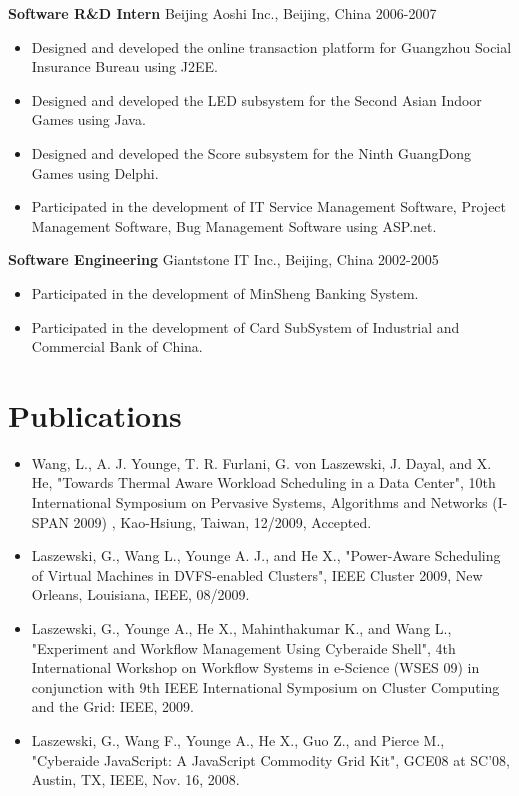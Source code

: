 \documentclass[margin]{res}
\begin{document}
\begin{resume}
{\bf Software R\&D Intern }  Beijing Aoshi Inc., Beijing, China 2006-2007
\begin{itemize}
\item Designed and developed the online transaction platform for Guangzhou Social Insurance Bureau using J2EE.
\item Designed and developed the LED subsystem for the Second Asian Indoor Games using Java.
\item Designed and developed the Score subsystem for the Ninth GuangDong Games using Delphi. 
\item Participated in the development of IT Service Management Software, Project Management Software, Bug Management Software using ASP.net. 
\end{itemize}
{\bf Software Engineering } Giantstone IT Inc., Beijing, China 2002-2005
\begin{itemize}
\item Participated in the development of MinSheng Banking System. 
\item Participated in the development of Card SubSystem of Industrial and Commercial Bank of China.
\end{itemize}

\section{Publications}

\begin{itemize}
\item Wang, L., A. J. Younge, T. R. Furlani, G. von Laszewski, J. Dayal, and X. He, "Towards Thermal Aware Workload Scheduling in a Data Center", 10th International Symposium on Pervasive Systems, Algorithms and Networks (I-SPAN 2009) , Kao-Hsiung, Taiwan, 12/2009, Accepted.
\item Laszewski, G., Wang L., Younge A. J., and He X.,  "Power-Aware Scheduling of Virtual Machines in DVFS-enabled Clusters",  IEEE Cluster 2009, New Orleans, Louisiana, IEEE, 08/2009.
\item Laszewski, G., Younge A., He X., Mahinthakumar K., and Wang L.,  "Experiment and Workflow Management Using Cyberaide Shell",  4th International Workshop on Workflow Systems in e-Science (WSES 09) in conjunction with 9th IEEE International Symposium on Cluster Computing and the Grid: IEEE, 2009.
\item Laszewski, G., Wang F., Younge A., He X., Guo Z., and Pierce M.,  "Cyberaide JavaScript: A JavaScript Commodity Grid Kit",  GCE08 at SC'08, Austin, TX, IEEE, Nov. 16, 2008.
\end{itemize}


\end{resume}
\end{document}
